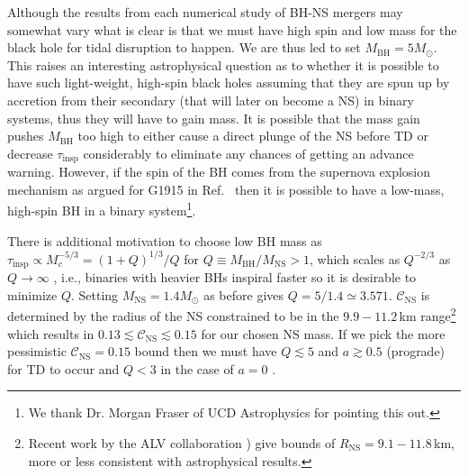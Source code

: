 \documentclass[prd,amsmath,amssymb,aps,floats,amsfonts,notitlepage,superscriptaddress,eqsecnum,nofootinbib,10pt]{revtex4-1}
\begin{document}
Although the results from each numerical study of BH-NS mergers may somewhat vary what is clear is that we must have high spin and low mass for the black hole for tidal disruption to happen. 
We are thus led to set $M_\text{BH} =5 M_\odot$. 
This raises an interesting astrophysical question as to whether it is possible to have such light-weight, high-spin black holes assuming that
they are spun up by accretion from their secondary (that will later on become a NS) in binary systems, thus they will have to gain mass.
It is possible that the mass gain pushes $M_\text{BH}$ too high to either cause a direct plunge of the NS before TD or decrease $\tau_\text{insp}$ considerably
to eliminate any chances of getting an advance warning.
However, if the spin of the BH comes from the supernova explosion mechanism as argued for G1915 in Ref.~\cite{McClintock:2006xd} then it is possible to have a 
low-mass, high-spin BH in a binary system\footnote{We thank Dr. Morgan Fraser of UCD Astrophysics
for pointing this out.}.

There is additional motivation to choose low BH mass as 
 $\tau_\text{insp} \propto M_c^{-5/3} = (1+Q)^{1/3}/Q$ for $Q\equiv M_\text{BH}/M_\text{NS} > 1$, which scales as $Q^{-2/3}$ as $Q\to\infty$ , i.e., binaries with heavier BHs inspiral faster
 so it is desirable to minimize $Q$.
 Setting $M_\text{NS}=1.4 M_\odot$ as before gives $Q=5/1.4  \simeq 3.571$. $\mathcal{C}_\text{NS}$ is determined by the radius of the NS constrained to be in the $9.9 - 11.2\,$km range\footnote{Recent work by the ALV collaboration \cite{GW170817_radii}) give bounds of $R_\text{NS}=9.1 -11.8\,$km, more or less consistent with astrophysical results.}\,\cite{Ozel:2016oaf}
 which results in $0.13\lesssim \mathcal{C}_\text{NS} \lesssim 0.15$ 
 for our chosen NS mass. 
If we pick the more pessimistic $\mathcal{C}_\text{NS} = 0.15$ bound then we must have $Q\lesssim 5$ and $a\gtrsim 0.5$ (prograde) for TD to occur \cite{Ferrari:2008nr}
and $Q< 3$ in the case of $a=0$ \cite{Kyutoku:2011vz}.
\end{document}
